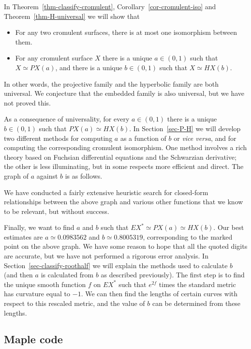 \documentclass[reqno]{amsart}
\renewcommand{\:}{\colon}
\theoremstyle{definition}
\begin{document}
In Theorem~\ref{thm-classify-cromulent},
Corollary~\ref{cor-cromulent-iso} and Theorem~\ref{thm-H-universal}
we will show that
\begin{itemize}
 \item For any two cromulent surfaces, there is at most one
  isomorphism between them.
 \item For any cromulent surface $X$ there is a unique $a\in (0,1)$
  such that $X\simeq PX(a)$, and there is a unique $b\in (0,1)$ such
  that $X\simeq HX(b)$.
\end{itemize}
In other words, the projective family and the hyperbolic family are
both universal.  We conjecture that the embedded family is also
universal, but we have not proved this.

As a consequence of universality, for every $a\in (0,1)$ there is a
unique $b\in (0,1)$ such that $PX(a)\simeq HX(b)$.  In
Section~\ref{sec-P-H} we will develop two different methods for
computing $a$ as a function of $b$ or \emph{vice versa}, and for
computing the corresponding cromulent isomorphism.  One method
involves a rich theory based on Fuchsian differential equations and
the Schwarzian derivative; the other is less illuminating, but in some
respects more efficient and direct.  The graph of $a$ against $b$ is
as follows.

We have conducted a fairly extensive heuristic
search for closed-form relationships between the above graph and
various other functions that we know to be relevant, but without
success.

Finally, we want to find $a$ and $b$ such that
$EX^*\simeq PX(a)\simeq HX(b)$.  Our best estimates are
$a\simeq 0.0983562$ and $b\simeq 0.8005319$, corresponding to the
marked point on the above graph.  We have some reason to hope that all
the quoted digits are accurate, but we have not performed a rigorous
error analysis.  In Section~\ref{sec-classify-roothalf} we will
explain the methods used to calculate $b$ (and then $a$ is calculated
from $b$ as described previously).  The first step is to find the
unique smooth function $f$ on $EX^*$ such that $e^{2f}$ times the
standard metric has curvature equal to $-1$.  We can then find the
lengths of certain curves with respect to this rescaled metric, and
the value of $b$ can be determined from these lengths.

\subsection{Maple code}
\end{document}
